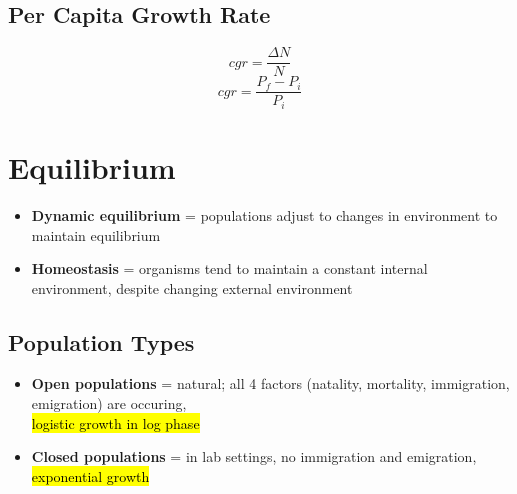 \documentclass[a4paper,12pt]{article}
\begin{document}
\subsection{Per Capita Growth Rate}
\Huge 
$$cgr = \frac{\Delta{N}}{N}$$
\normalsize
$$cgr = \frac{P_f - P_i}{P_i}$$

\section{Equilibrium}
\begin{itemize}
    \item{\textbf{Dynamic equilibrium} = populations adjust to changes in environment to maintain equilibrium}
    \item{\textbf{Homeostasis} = organisms tend to maintain a constant internal environment, despite changing external environment}
\end{itemize}

\subsection{Population Types}
\begin{itemize}
    \item{\textbf{Open populations} = natural; all 4 factors (natality, mortality, immigration, emigration) are occuring, \\ \hl{logistic growth in log phase}}
    \item{\textbf{Closed populations} = in lab settings, no immigration and emigration, \\ \hl{exponential growth}}
\end{itemize}
\end{document}
